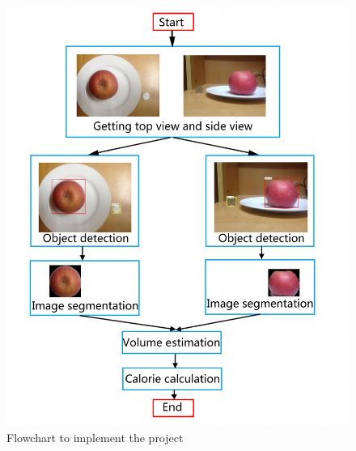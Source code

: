 \documentclass[12pt, a4paper, twoside]{article}
\begin{document}
	\begin{figure}[p]
		\centering
		\includegraphics[width=\textwidth]{roadmap}
		\caption{Flowchart to implement the project\cite{liang}}
		\label{F:roadmap}
	\end{figure}
	
	\printbibliography
\end{document}
